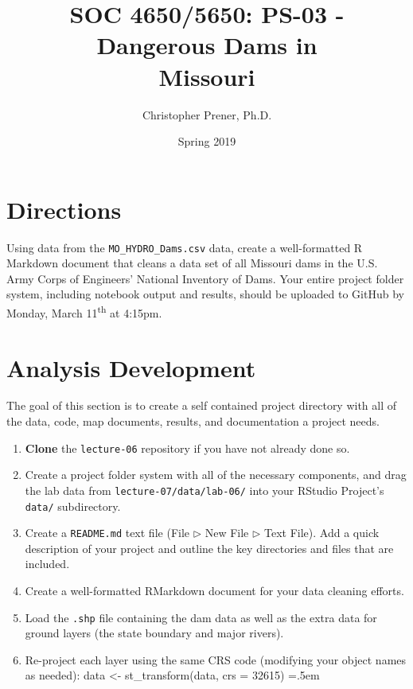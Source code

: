 \documentclass{tufte-handout}
\title{SOC 4650/5650: PS-03 - Dangerous Dams in \\Missouri}
\author{Christopher Prener, Ph.D.}
\date{Spring 2019}
\newenvironment{codeBlock}
 {\SaveVerbatim{cverb}}
 {\endSaveVerbatim
  \flushleft\fboxrule=0pt\fboxsep=.5em
  \colorbox{cverbbg}{%
    \makebox[\dimexpr\linewidth-2\fboxsep][l]{\BUseVerbatim{cverb}}%
  }
  \endflushleft
}
\begin{document}
\maketitle %

\vspace{5mm}
\section{Directions}
Using data from the \texttt{MO\_HYDRO\_Dams.csv} data, create a well-formatted R Markdown document that cleans a data set of all Missouri dams in the U.S. Army Corps of Engineers' National Inventory of Dams. Your entire project folder system, including notebook output and results, should be uploaded to GitHub by Monday, March 11\textsuperscript{th} at 4:15pm.

\vspace{5mm}
\section{Analysis Development}
The goal of this section is to create a self contained project directory with all of the data, code, map documents, results, and documentation a project needs.

\begin{enumerate}[label=\alph*.]
\item \textbf{Clone} the \texttt{lecture-06} repository if you have not already done so.
\item Create a project folder system with all of the necessary components, and drag the lab data from \texttt{lecture-07/data/lab-06/} into your RStudio Project's \texttt{data/} subdirectory.
\item Create a \texttt{README.md} text file (\textsf{File $\triangleright$} {\color{red}\textsf{New File}} \textsf{$\triangleright$ Text File}). Add a quick description of your project and outline the key directories and files that are included. 
\item Create a well-formatted RMarkdown document for your data cleaning efforts.
\item Load the \texttt{.shp} file containing the dam data as well as the extra data for ground layers (the state boundary and major rivers).
\item Re-project each layer using the same CRS code (modifying your object names as needed):
\begin{codeBlock}
data <- st_transform(data, crs = 32615)
\end{codeBlock}
\end{enumerate}
\end{document}
